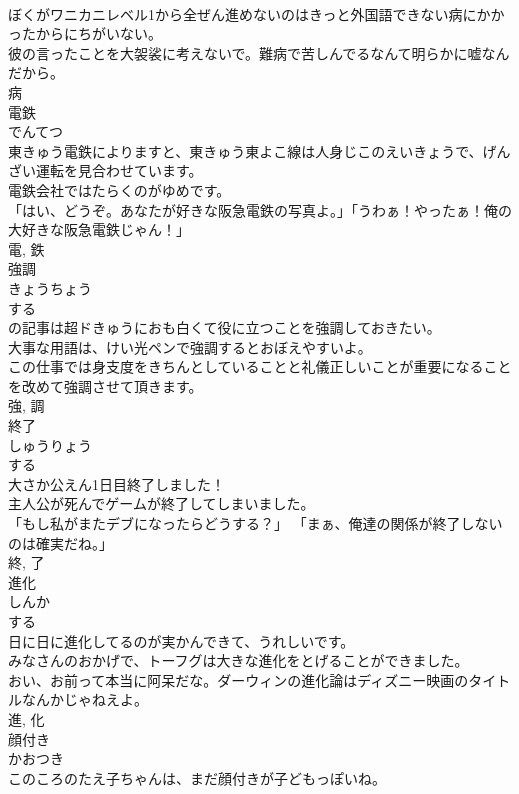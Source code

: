\documentclass[8pt]{extreport}
\begin{document}
\begin{CJK}{UTF8}{min}
\\	ぼくがワニカニレベル1から全ぜん進めないのはきっと外国語できない病にかかったからにちがいない。	
\\	彼の言ったことを大袈裟に考えないで。難病で苦しんでるなんて明らかに嘘なんだから。	
\\	病	
\\	電鉄	
\\	でんてつ	
\\	東きゅう電鉄によりますと、東きゅう東よこ線は人身じこのえいきょうで、げんざい運転を見合わせています。	
\\	電鉄会社ではたらくのがゆめです。	
\\	「はい、どうぞ。あなたが好きな阪急電鉄の写真よ。」「うわぁ！やったぁ！俺の大好きな阪急電鉄じゃん！」	
\\	電, 鉄	
\\	強調	
\\	きょうちょう	
\\	する 
\\	の記事は超ドきゅうにおも白くて役に立つことを強調しておきたい。	
\\	大事な用語は、けい光ペンで強調するとおぼえやすいよ。	
\\	この仕事では身支度をきちんとしていることと礼儀正しいことが重要になることを改めて強調させて頂きます。	
\\	強, 調	
\\	終了	
\\	しゅうりょう	
\\	する 
\\	大さか公えん1日目終了しました！	
\\	主人公が死んでゲームが終了してしまいました。	
\\	「もし私がまたデブになったらどうする？」 「まぁ、俺達の関係が終了しないのは確実だね。」	
\\	終, 了	
\\	進化	
\\	しんか	
\\	する 
\\	日に日に進化してるのが実かんできて、うれしいです。	
\\	みなさんのおかげで、トーフグは大きな進化をとげることができました。	
\\	おい、お前って本当に阿呆だな。ダーウィンの進化論はディズニー映画のタイトルなんかじゃねえよ。	
\\	進, 化	
\\	顔付き	
\\	かおつき	
\\	このころのたえ子ちゃんは、まだ顔付きが子どもっぽいね。	

\end{CJK}
\end{document}
